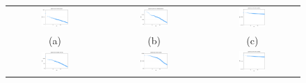 \begin{figure}[!htbf]
\begin{center}
\begin{tabular}{c c c}
     \includegraphics[width=0.3\textwidth]{FIG/t2_amazon.png} &
     \includegraphics[width=0.3\textwidth]{FIG/t2_berke.png} &
     \includegraphics[width=0.3\textwidth]{FIG/t2_ca.png}\\
    (a) & (b) & (c)\\
     \includegraphics[width=0.3\textwidth]{FIG/t2_enron.png} &
     \includegraphics[width=0.3\textwidth]{FIG/t2_google.png} &
     \includegraphics[width=0.3\textwidth]{FIG/t2_pa.png} \\

\end{tabular}
\end{center}
\end{figure}
